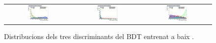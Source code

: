 \begin{figure}[htbp]
  \centering
  \setlength{\tabcolsep}{1.5pt}
  \renewcommand{\arraystretch}{0}
  \begin{tabular}{@{}c c c@{}}
    \includegraphics[width=0.33\textwidth]{images/plots_overtrain_lt200/overtrain_Signal_BDTG.png} &
    \includegraphics[width=0.33\textwidth]{images/plots_overtrain_lt200/overtrain_bkgZ_BDTG.png} &  
    \includegraphics[width=0.33\textwidth]{images/plots_overtrain_lt200/overtrain_bkgtt_BDTG.png}
  \end{tabular}
  \caption{Distribucions dels tres discriminants del BDT entrenat a baix \pth.}
  \label{res:lowpt_scores}
\end{figure}

